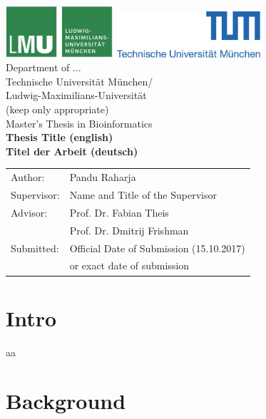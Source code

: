 \documentclass[pdftex,12pt,a4paper]{report}
\begin{document}
\begin{titlepage}
{\sffamily


\begin{center}
\includegraphics[width=0.3\textwidth]{logo2.jpg}
\hfill
\includegraphics[width=0.4\textwidth]{logo1.jpg}  
\\[1.5cm]  

{\LARGE Department of ...}\\[0.5cm]
{Technische Universit\"at M\"unchen/}\\
{Ludwig-Maximilians-Universit\"at}\\(keep only appropriate)\\[1cm]

{\Large Master's Thesis in Bioinformatics}\\[2cm]
{\textbf{\LARGE Thesis Title (english)}}\\[2cm]
{\textbf{\LARGE Titel der Arbeit (deutsch)}}\\[4cm]

\end{center}
\begin{center}\Large
  \begin{tabular}{ll}
    Author:& Pandu Raharja\\
    Supervisor: &  Name and Title of the Supervisor\\
    Advisor:        &  Prof. Dr. Fabian Theis\\
    & Prof. Dr. Dmitrij Frishman\\
    Submitted:     &  Official Date of Submission (15.10.2017)\\
    & or exact date of submission
  \end{tabular}
\end{center}

}%

\end{titlepage}



\chapter{Intro}

aa

\chapter{Background}
\end{document}
